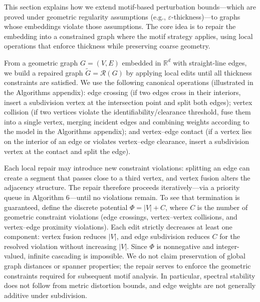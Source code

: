 \documentclass[
  11pt,
  letterpaper]{siamart251216}
\begin{document}
This section explains how we extend motif-based perturbation
bounds---which are proved under geometric regularity assumptions (e.g.,
\(\varepsilon\)-thickness)---to graphs whose embeddings violate those
assumptions. The core idea is to repair the embedding into a constrained
graph where the motif strategy applies, using local operations that
enforce thickness while preserving coarse geometry.

From a geometric graph \(G=(V,E)\) embedded in \(\mathbb{R}^d\) with
straight-line edges, we build a repaired graph
\(\widetilde G = \mathcal R(G)\) by applying local edits until all
thickness constraints are satisfied. We use the following canonical
operations (illustrated in the Algorithms appendix): edge crossing (if
two edges cross in their interiors, insert a subdivision vertex at the
intersection point and split both edges); vertex collision (if two
vertices violate the identifiability/clearance threshold, fuse them into
a single vertex, merging incident edges and combining weights according
to the model in the Algorithms appendix); and vertex--edge contact (if a
vertex lies on the interior of an edge or violates vertex--edge
clearance, insert a subdivision vertex at the contact and split the
edge).

Each local repair may introduce new constraint violations: splitting an
edge can create a segment that passes close to a third vertex, and
vertex fusion alters the adjacency structure. The repair therefore
proceeds iteratively---via a priority queue in Algorithm 6---until no
violations remain. To see that termination is guaranteed, define the
discrete potential \(\Phi = |V| + C\), where \(C\) is the number of
geometric constraint violations (edge crossings, vertex--vertex
collisions, and vertex--edge proximity violations). Each edit strictly
decreases at least one component: vertex fusion reduces \(|V|\), and
edge subdivision reduces \(C\) for the resolved violation without
increasing \(|V|\). Since \(\Phi\) is nonnegative and integer-valued,
infinite cascading is impossible. We do not claim preservation of global
graph distances or spanner properties; the repair serves to enforce the
geometric constraints required for subsequent motif analysis. In
particular, spectral stability does not follow from metric distortion
bounds, and edge weights are not generally additive under subdivision.
\end{document}
